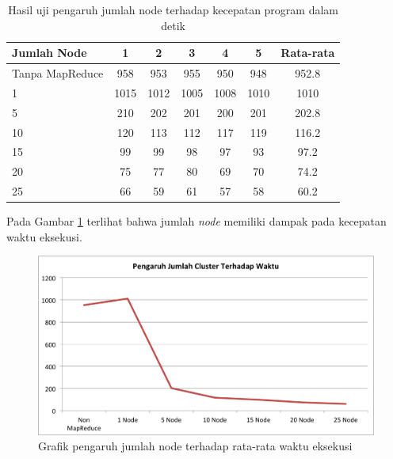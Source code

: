 \begin{table}
	\centering
	\begin{tabular}{ | l | c | c | c | c | c | c |}
		\hline
		Jumlah Node	& 1 & 2 & 3 & 4 & 5 & Rata-rata  \\
		\hline
		Tanpa MapReduce & 958	& 953	& 955	& 950	& 948  & 952.8\\
		1	& 1015	& 1012	& 1005	& 1008	& 1010 & 1010\\
		5	& 210	& 202	& 201	& 200	& 201 & 202.8\\
		10	 & 120	& 113	& 112	& 117	& 119 & 116.2\\
		15	 & 99	 & 99 & 98	 & 97 	& 93  & 97.2\\
		20	 & 75	 & 77 & 80	 & 69	 & 70 & 74.2\\
		25	 & 66	 & 59	 & 61 & 57	 & 58 & 60.2\\
		\hline
	\end{tabular}	
	\caption{Hasil uji pengaruh jumlah node terhadap kecepatan program dalam detik}\label{tab:waktu_node}
\end{table}	

Pada Gambar \ref{fig:eks_node_size} terlihat bahwa jumlah \textit{node} memiliki dampak pada kecepatan waktu eksekusi.

\begin{figure}[H]
	\centering
	\includegraphics[scale=0.5]{Gambar/eks-node-size.png}
	\caption[Grafik pengaruh jumlah node terhadap rata-rata waktu eksekusi]{Grafik pengaruh jumlah node terhadap rata-rata waktu eksekusi} 
	\label{fig:eks_node_size}
\end{figure}

